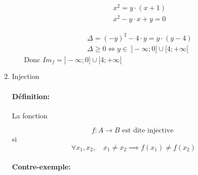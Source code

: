 \documentclass[
    11pt,
    a4paper,
    oneside,
    headinlcude, footinclude,
    twoside,
]{report}
\begin{document}
\begin{enumerate}
\begin{enumerate}
\[
\begin{split}
x^{2} = y \cdot (x + 1)\\
x^{2} - y \cdot x + y = 0
\end{split}
\]

\[
\begin{split}
\Delta = (-y)^{2} - 4\cdot y = y \cdot (y - 4)\\
\Delta \geq 0 \iff y \in\ ]-\infty; 0] \cup [4; + \infty[
\end{split}
\]
Donc $Im_{f} = ]-\infty; 0] \cup [4; + \infty[$
\end{enumerate}

\item Injection

\paragraph{Définition:} La fonction

$$f: A \to B \text{ est dite injective }$$
si $$\forall x_{1}, x_{2}, \quad x_{1} \neq x_{2} \implies f(x_{1})
\neq f(x_{2})$$

\paragraph{Contre-exemple:}


\end{enumerate}
\end{document}

